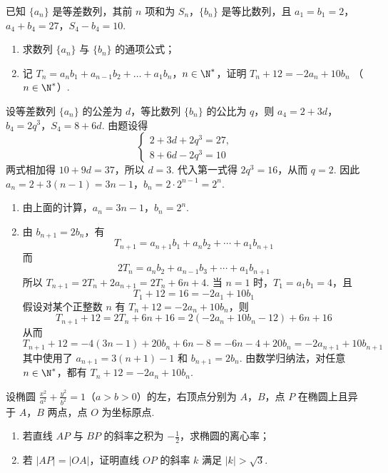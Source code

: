 \begin{problem}
已知 \(\{a_{n}\}\) 是等差数列，其前 \(n\) 项和为 \(S_{n}\)，\(\{b_{n}\}\) 是等比数列，且 \(a_{1} = b_{1} = 2\)，\(a_{4} + b_{4} = 27\)，\(S_{4} - b_{4} = 10\).

\begin{enumerate}
\item 求数列 \( \{a_{n}\} \) 与 \( \{b_{n}\} \) 的通项公式；
\item 记 \(T_{n} = a_{n}b_{1} + a_{n - 1}b_{2} + \dots +a_{1}b_{n}\)，\(n \in \N^*\)，证明 \(T_{n} + 12 = -2a_{n} + 10b_{n}\) （\(n \in \N^*\)）.
\end{enumerate}

\end{problem}

\begin{solution}
设等差数列 \(\{a_n\}\) 的公差为 \(d\)，等比数列 \(\{b_n\}\) 的公比为 \(q\)，则 \(a_4=2+3d\)，\(b_4=2q^3\)，\(S_4=8+6d\). 由题设得
\[
\begin{cases}
2+3d+2q^3=27,\\
8+6d-2q^3=10
\end{cases}
\]
两式相加得 \(10+9d=37\)，所以 \(d=3\). 代入第一式得 \(2q^3=16\)，从而 \(q=2\). 因此 \(a_n=2+3(n-1)=3n-1\)，\(b_n=2\cdot2^{n-1}=2^n\).
\begin{enumerate}
\item 由上面的计算，\(a_n=3n-1\)，\(b_n=2^n\).
\item 由 \(b_{n+1}=2b_n\)，有
\[
T_{n+1}=a_{n+1}b_1+a_nb_2+\cdots+a_1b_{n+1}
\]
而
\[
2T_n=a_nb_2+a_{n-1}b_3+\cdots+a_1b_{n+1}
\]
所以 \(T_{n+1}=2T_n+2a_{n+1}=2T_n+6n+4\). 当 \(n=1\) 时，\(T_1=a_1b_1=4\)，且
\[
T_1+12=16=-2a_1+10b_1
\]
假设对某个正整数 \(n\) 有 \(T_n+12=-2a_n+10b_n\)，则
\[
T_{n+1}+12=2T_n+6n+16=2(-2a_n+10b_n-12)+6n+16
\]
从而
\[
T_{n+1}+12=-4(3n-1)+20b_n+6n-8=-6n-4+20b_n=-2a_{n+1}+10b_{n+1}
\]
其中使用了 \(a_{n+1}=3(n+1)-1\) 和 \(b_{n+1}=2b_n\). 由数学归纳法，对任意 \(n\in\N^*\)，都有 \(T_n+12=-2a_n+10b_n\).
\end{enumerate}
\end{solution}

\begin{problem}
设椭圆 \(\frac{x^2}{a^2} + \frac{y^2}{b^2} = 1\)（\(a > b > 0\)）的左，右顶点分别为 \(A\)，\(B\)，点 \(P\) 在椭圆上且异于 \(A\)，\(B\) 两点，点 \(O\) 为坐标原点.

\begin{enumerate}
\item 若直线 \(AP\) 与 \(BP\) 的斜率之积为 \(-\frac{1}{2}\)，求椭圆的离心率；
\item 若 \( \left|AP\right|=\left|OA\right| \)，证明直线 \(OP\) 的斜率 \(k\) 满足 \( \left|k\right|>\sqrt{3} \).
\end{enumerate}

\end{problem}

